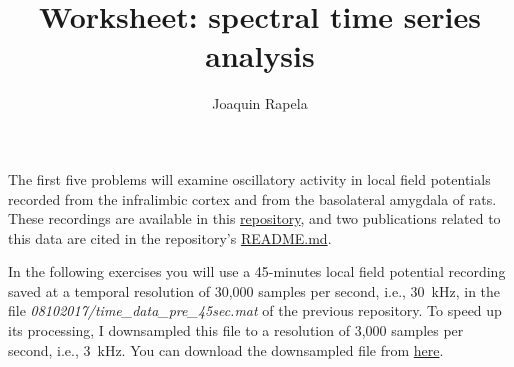 \documentclass[12pt]{article}
\title{Worksheet: spectral time series analysis}
\author{Joaquin Rapela}
\begin{document}
\maketitle

The first five problems will examine oscillatory activity in local field
potentials recorded from the infralimbic cortex and from the basolateral amygdala
of rats. These recordings are available in this
\href{https://github.com/tne-lab/cl-example-data}{repository}, and two
publications related to this data are cited in the repository's
\href{https://github.com/tne-lab/cl-example-data/README.md}{README.md}.

In the following exercises you will use a 45-minutes local field potential
recording
saved at a temporal resolution of 30,000 samples per second, i.e., 30~kHz, in the file
\emph{08102017/time\_data\_pre\_45sec.mat}
of the previous repository.
To speed up its processing, I downsampled this file
to a resolution of 3,000 samples per second, i.e., 3~kHz.
You can download the downsampled file from
\href{https://www.gatsby.ucl.ac.uk/~rapela/statNeuro/2025/lectures/03_spectralTimeSeriesAnalysis/data/time_data_pre_45sec_ds10_v6.mat}{here}.
\end{document}

